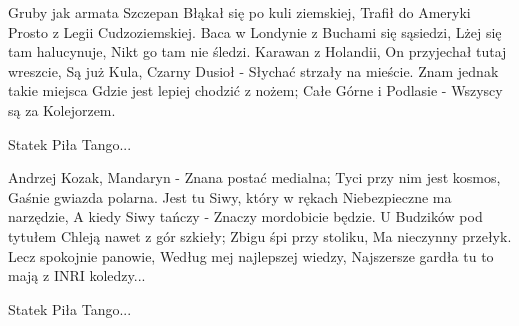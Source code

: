 \documentclass[../../../songbook.tex]{subfiles}
\begin{document}
\begin{multicols}{2}
{Gruby jak armata Szczepan 	\newline
Błąkał się po kuli ziemskiej,	\newline
Trafił do Ameryki 	\newline
Prosto z Legii Cudzoziemskiej.	\newline
Baca w Londynie z Buchami się sąsiedzi,	\newline
Lżej się tam halucynuje, 	\newline
Nikt go tam nie śledzi.	\newline
Karawan z Holandii, 	\newline
On przyjechał tutaj wreszcie,	\newline
Są już Kula, Czarny Dusioł - 	\newline
Słychać strzały na mieście.	\newline
Znam jednak takie miejsca 	\newline
Gdzie jest lepiej chodzić z nożem;	\newline
Całe Górne i Podlasie - 	\newline
Wszyscy są za Kolejorzem.	\newline

\-\hspace{0.5cm} Statek Piła Tango...	\newline

Andrzej Kozak, Mandaryn - 	\newline
Znana postać medialna;	\newline
Tyci przy nim jest kosmos, 	\newline
Gaśnie gwiazda polarna.	\newline
Jest tu Siwy, który w rękach 	\newline
Niebezpieczne ma narzędzie,	\newline
A kiedy Siwy tańczy - 	\newline
Znaczy mordobicie będzie.	\newline
U Budzików pod tytułem 	\newline
Chleją nawet z gór szkieły;	\newline
Zbigu śpi przy stoliku, 	\newline
Ma nieczynny przełyk.	\newline
Lecz spokojnie panowie, 	\newline
Według mej najlepszej wiedzy,	\newline
Najszersze gardła tu to mają z INRI koledzy...	\newline

\-\hspace{0.5cm} Statek Piła Tango...	\newline

}
\end{multicols}
\end{document}
